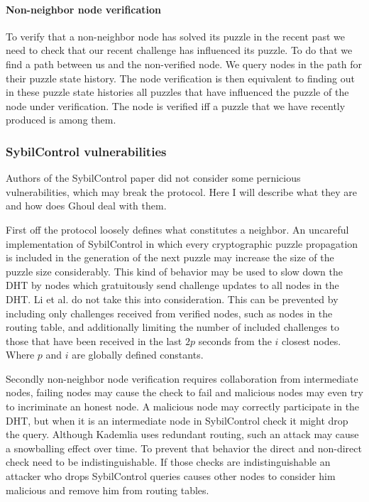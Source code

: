   \paragraph{Non-neighbor node verification}
  To verify that a non-neighbor node has solved its puzzle in the recent past we
  need to check that our recent challenge has influenced its puzzle. To do that
  we find a path between us and the non-verified node. We query nodes in the
  path for their puzzle state history. The node verification is then equivalent
  to finding out in these puzzle state histories all puzzles that have
  influenced the puzzle of the node under verification. The node is verified iff
  a puzzle that we have recently produced is among them.

\subsubsection{SybilControl vulnerabilities}
  Authors of the SybilControl paper did not consider some pernicious
  vulnerabilities, which may break the protocol. Here I will describe what they
  are and how does Ghoul deal with them.

  First off the protocol loosely defines what constitutes a neighbor. An
  uncareful implementation of SybilControl in which every cryptographic puzzle
  propagation is included in the generation of the next puzzle may increase the
  size of the puzzle size considerably. This kind of behavior may be used to
  slow down the DHT by nodes which gratuitously send challenge updates to all
  nodes in the DHT. Li et al. do not take this into consideration. This can
  be prevented by including only challenges received from verified nodes, such
  as nodes in the routing table, and additionally limiting the number of
  included challenges to those that have been received in the last $2p$ seconds
  from the $i$ closest nodes. Where $p$ and $i$ are globally defined constants.

  Secondly non-neighbor node verification requires collaboration from
  intermediate nodes, failing nodes may cause the check to fail and malicious
  nodes may even try to incriminate an honest node. A malicious node may
  correctly participate in the DHT, but when it is an intermediate node in
  SybilControl check it might drop the query. Although Kademlia uses redundant
  routing, such an attack may cause a snowballing effect over time. To prevent
  that behavior the direct and non-direct check need to be indistinguishable.
  If those checks are indistinguishable an attacker who drops SybilControl
  queries causes other nodes to consider him malicious and remove him from
  routing tables.

